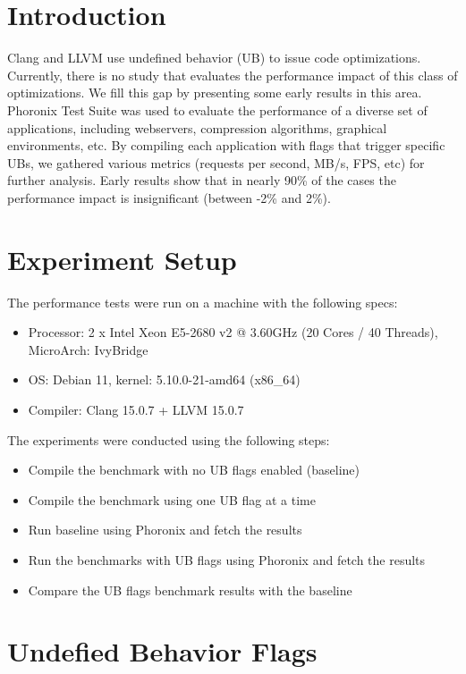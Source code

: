 \documentclass{sciposter}
\begin{document}
\begin{multicols}{3}

\section{Introduction}
Clang and LLVM use undefined behavior (UB) to issue code optimizations.
Currently, there is no study that evaluates the performance impact of this class
of optimizations. We fill this gap by presenting some early results in this
area. Phoronix Test Suite was used to evaluate the performance of a diverse set
of applications, including webservers, compression algorithms, graphical
environments, etc. By compiling each application with flags that trigger
specific UBs, we gathered various metrics (requests per second, MB/s, FPS,
etc) for further analysis. Early results show that in nearly 90\% of the cases
the performance impact is insignificant (between -2\% and 2\%).

\section{Experiment Setup}
The performance tests were run on a machine with the following specs:
\begin{itemize}
\item Processor: 2 x Intel Xeon E5-2680 v2 @ 3.60GHz (20 Cores / 40 Threads), MicroArch: IvyBridge
\item OS: Debian 11, kernel: 5.10.0-21-amd64 (x86\_64)
\item Compiler: Clang 15.0.7 + LLVM 15.0.7
\end{itemize}
\bigbreak
\bigbreak
The experiments were conducted using the following steps:
\begin{itemize}
\item Compile the benchmark with no UB flags enabled (baseline)
\item Compile the benchmark using one UB flag at a time
\item Run baseline using Phoronix and fetch the results
\item Run the benchmarks with UB flags using Phoronix and fetch the results
\item Compare the UB flags benchmark results with the baseline
\end{itemize}

\section{Undefied Behavior Flags}


\end{multicols}
\end{document}
